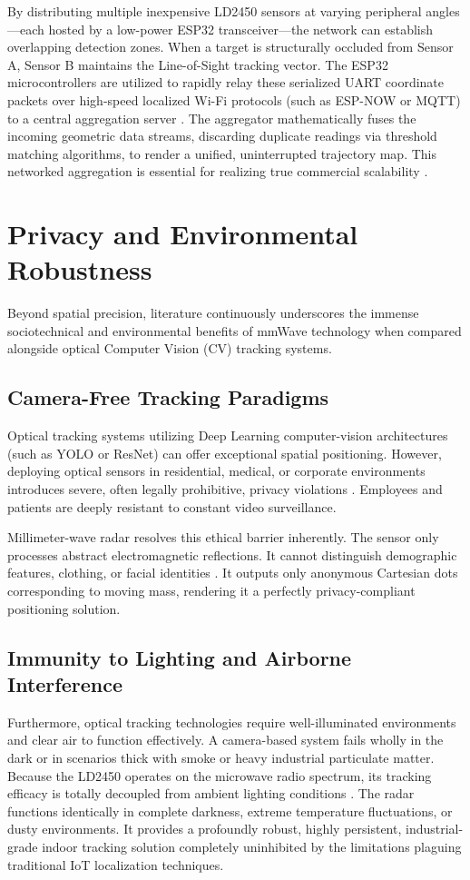 By distributing multiple inexpensive LD2450 sensors at varying peripheral angles—each hosted by a low-power ESP32 transceiver—the network can establish overlapping detection zones. When a target is structurally occluded from Sensor A, Sensor B maintains the Line-of-Sight tracking vector. The ESP32 microcontrollers are utilized to rapidly relay these serialized UART coordinate packets over high-speed localized Wi-Fi protocols (such as ESP-NOW or MQTT) to a central aggregation server \cite{espressif2023espnow}. The aggregator mathematically fuses the incoming geometric data streams, discarding duplicate readings via threshold matching algorithms, to render a unified, uninterrupted trajectory map. This networked aggregation is essential for realizing true commercial scalability \cite{niculescu2001ad}.

\section{Privacy and Environmental Robustness}

Beyond spatial precision, literature continuously underscores the immense sociotechnical and environmental benefits of mmWave technology when compared alongside optical Computer Vision (CV) tracking systems.

\subsection{Camera-Free Tracking Paradigms}

Optical tracking systems utilizing Deep Learning computer-vision architectures (such as YOLO or ResNet) can offer exceptional spatial positioning. However, deploying optical sensors in residential, medical, or corporate environments introduces severe, often legally prohibitive, privacy violations \cite{zhang2018privacy}. Employees and patients are deeply resistant to constant video surveillance. 

Millimeter-wave radar resolves this ethical barrier inherently. The sensor only processes abstract electromagnetic reflections. It cannot distinguish demographic features, clothing, or facial identities \cite{ye2020privacy}. It outputs only anonymous Cartesian dots corresponding to moving mass, rendering it a perfectly privacy-compliant positioning solution.

\subsection{Immunity to Lighting and Airborne Interference}

Furthermore, optical tracking technologies require well-illuminated environments and clear air to function effectively. A camera-based system fails wholly in the dark or in scenarios thick with smoke or heavy industrial particulate matter. Because the LD2450 operates on the microwave radio spectrum, its tracking efficacy is totally decoupled from ambient lighting conditions \cite{wei2014key}. The radar functions identically in complete darkness, extreme temperature fluctuations, or dusty environments. It provides a profoundly robust, highly persistent, industrial-grade indoor tracking solution completely uninhibited by the limitations plaguing traditional IoT localization techniques.
